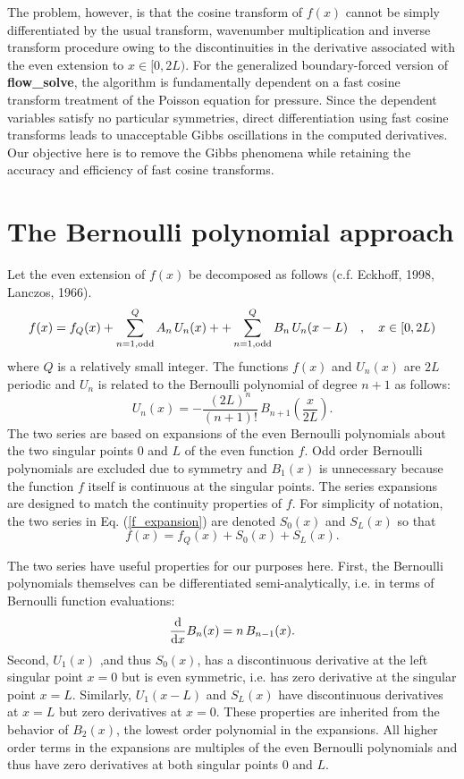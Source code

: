 \documentclass{jfm-like}
\begin{document}
The problem, however, is that the cosine transform of $f(x)$ cannot be simply differentiated by the usual transform, wavenumber multiplication and inverse transform procedure owing to the discontinuities
in the derivative associated with the even extension to $x \in [0,2L)$. For the generalized boundary-forced version of {\bf flow\_solve}, the algorithm is fundamentally dependent on a fast cosine transform
treatment of the Poisson equation for pressure. Since the dependent variables satisfy no particular symmetries, direct differentiation using fast cosine transforms leads to unacceptable Gibbs oscillations in the
computed derivatives. Our objective here is to remove the Gibbs phenomena while retaining the accuracy and efficiency of fast cosine transforms.

\section{The Bernoulli polynomial approach}
Let the even extension of $f(x)$ be decomposed as follows (c.f. Eckhoff, 1998, Lanczos, 1966).
\begin{equation}
f(x) = f_Q(x) + \sum_{n=1, {\rm odd}}^Q A_n \, U_n(x) + + \sum_{n=1, {\rm odd}}^Q B_n \, U_n(x-L) ~~~,~~~ x \in [0,2L)
\label{f_expansion}
\end{equation}
where $Q$ is a relatively small integer. The functions $f(x)$ and $U_n(x)$ are $2L$ periodic and $U_n$ is related to the Bernoulli polynomial of degree $n+1$ as follows:
\begin{equation}
U_n(x) = - \frac{(2L)^n}{(n+1)!} \, B_{n+1} \left( \frac{x}{2L} \right).
\end{equation}
The two series are based on expansions of the even Bernoulli polynomials about the two singular points $0$ and $L$ of the even function $f$. Odd order Bernoulli polynomials are excluded due to symmetry
and $B_1(x)$ is unnecessary because the function $f$ itself is continuous at the singular points. The series expansions are designed to match the continuity properties of $f$. For simplicity of notation, the two
series in Eq. (\ref{f_expansion}) are denoted $S_0(x)$ and $S_L(x)$ so that
\begin{equation}
f(x) = f_Q(x) + S_0(x) + S_L(x).
\end{equation}

The two series have useful properties for our purposes here. First, the Bernoulli polynomials themselves can be differentiated semi-analytically, i.e. in terms of Bernoulli function evaluations:
\begin{equation}
\frac{\rm d}{ {\rm d} x} B_n(x) = n \, B_{n-1}(x).
\end{equation}
Second, $U_1(x)$ ,and thus $S_0(x)$, has a discontinuous derivative at the left singular point $x=0$ but is even symmetric, i.e. has zero derivative at the singular point $x=L$. Similarly, $U_1(x-L)$ and $S_L(x)$
have discontinuous derivatives at $x=L$ but zero derivatives at $x=0$. These properties are inherited from the behavior of $B_2(x)$, the lowest order polynomial in the expansions. All higher order terms in the expansions
are multiples of the even Bernoulli polynomials and thus have zero derivatives at both singular points $0$ and $L$.
\end{document}
